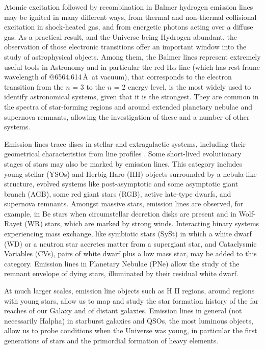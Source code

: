 \documentclass[fleqn,usenatbib]{mnras}
\newcommand{\rlopes}[1]{\textcolor{blue}{#1}}
\begin{document}
Atomic excitation followed by recombination in Balmer hydrogen emission lines may be ignited in many different ways, from thermal and non-thermal collisional excitation in shock-heated gas, and from energetic photons acting over a diffuse gas. As a practical result, and the Universe being Hydrogen abundant, the observation of those electronic transitions offer an important window into the study of astrophysical objects. Among them, the Balmer lines represent extremely useful tools in Astronomy and in particular the red H$\alpha$ line (which has rest-frame wavelength of $@$6564.614\,\AA\ at vacuum), that corresponds to the electron transition from the $ n $ = 3 to the $ n $ = 2 energy level, is the most widely used to identify astronomical systems, given that it is the strongest. They are common in the spectra of star-forming regions and around extended planetary nebulae and supernova remnants, allowing the investigation of these and a number of other systems.  


Emission lines trace  discs \citep{Schwope:2000, Ratti:2012} in stellar and extragalactic systems, including their geometrical characteristics from line profiles \citep{Horne:1986}. Some short-lived evolutionary stages of stars may also be marked by emission lines. This category includes young stellar (YSOs) and Herbig-Haro (HH) objects surrounded by a 
nebula-like structure, evolved systems like 
post-asymptotic and some asymptotic giant branch (AGB), some
red giant stars (RGB), active late-type dwarfs, and supernova remnants. 
Amongst massive stars, emission lines are observed, for example, in Be stars when 
circumstellar decretion disks are present and in Wolf-Rayet (WR) stars, which are marked by strong winds.  
Interacting binary systems experiencing mass exchange, 
like symbiotic stars (SySt) in which a white dwarf (WD) or a neutron star accretes matter from a supergiant star, and Cataclysmic Variables (CVs), pairs of  white dwarf plus a low mass star, may be added to this category. Emission lines in Planetary Nebulae (PNe) allow the study of the remnant envelope of dying stars, illuminated by their residual white dwarf. 

At much larger scales, emission line objects such as H II regions, around regions with young stars, allow us to map and study the star formation history of the far reaches of our Galaxy and of distant galaxies. Emission lines in general (not necessarily Halpha) in starburst galaxies and QSOs, the most luminous objects, allow us to probe conditions when the Universe was young, in particular the first generations of stars and the primordial formation of heavy elements. 
\end{document}
